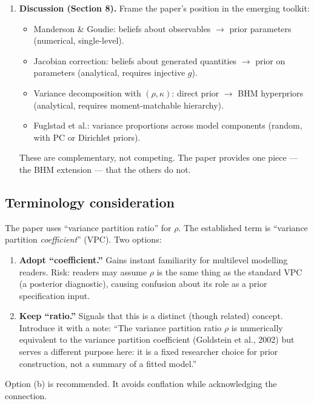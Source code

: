 \documentclass[12pt,a4paper]{article}
\begin{document}
\begin{enumerate}
  \item \textbf{Discussion (Section 8).} Frame the paper's position in the
    emerging toolkit:
    \begin{itemize}
      \item Manderson \& Goudie: beliefs about observables $\to$ prior
        parameters (numerical, single-level).
      \item Jacobian correction: beliefs about generated quantities $\to$ prior
        on parameters (analytical, requires injective $g$).
      \item Variance decomposition with $(\rho, \kappa)$: direct prior $\to$
        BHM hyperpriors (analytical, requires moment-matchable hierarchy).
      \item Fuglstad et al.: variance proportions across model components
        (random, with PC or Dirichlet priors).
    \end{itemize}
    These are complementary, not competing. The paper provides one piece ---
    the BHM extension --- that the others do not.
\end{enumerate}

\subsection{Terminology consideration}

The paper uses ``variance partition ratio'' for $\rho$. The established term is
``variance partition \emph{coefficient}'' (VPC). Two options:

\begin{enumerate}[label=(\alph*)]
  \item \textbf{Adopt ``coefficient.''} Gains instant familiarity for
    multilevel modelling readers. Risk: readers may assume $\rho$ is the same
    thing as the standard VPC (a posterior diagnostic), causing confusion about
    its role as a prior specification input.
  \item \textbf{Keep ``ratio.''} Signals that this is a distinct (though
    related) concept. Introduce it with a note: ``The variance partition ratio
    $\rho$ is numerically equivalent to the variance partition coefficient
    (Goldstein et al., 2002) but serves a different purpose here: it is a fixed
    researcher choice for prior construction, not a summary of a fitted model.''
\end{enumerate}

\noindent Option (b) is recommended. It avoids conflation while acknowledging
the connection.

\printbibliography
\end{document}

